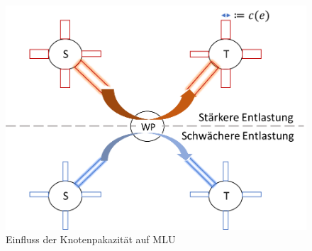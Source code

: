 \documentclass[sigconf,noacm,review]{acmart}
\begin{document}
\begin{figure}[h]
  \centering 
  \includegraphics[width=\linewidth]{abbildungen/kWPO_Capacity.png}
  \caption{Einfluss der Knotenpakazität auf MLU}
\end{figure}
\end{document}
